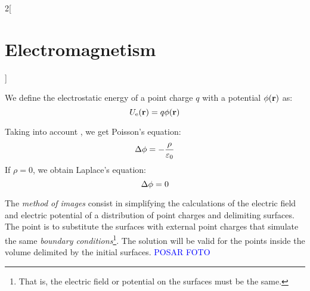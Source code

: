 \documentclass[../../../main_physics.tex]{subfiles}
\begin{document}
\begin{multicols}{2}[\section{Electromagnetism}]
\begin{definition}
    We define the electrostatic energy of a point charge $q$ with a potential $\phi(\boldsymbol{\mathrm{r}})$ as: $$U_\text{e}(\boldsymbol{\mathrm{r}})=q\phi(\boldsymbol{\mathrm{r}})$$
  \end{definition}
  \begin{proposition}
    Taking into account , we get Poisson's equation: $$\Delta\phi=-\frac{\rho}{\varepsilon_0}$$ If $\rho=0$, we obtain Laplace's equation: $$\Delta\phi=0$$
  \end{proposition}
  \begin{proposition}
    The \emph{method of images} consist in simplifying the calculations of the electric field and electric potential of a distribution of point charges and delimiting surfaces. The point is to substitute the surfaces with external point charges that simulate the same \emph{boundary conditions}\footnote{That is, the electric field or potential on the surfaces must be the same.}. The solution will be valid for the points inside the volume delimited by the initial surfaces. \textcolor{blue}{POSAR FOTO}
  \end{proposition}

\end{multicols}
\end{document}
